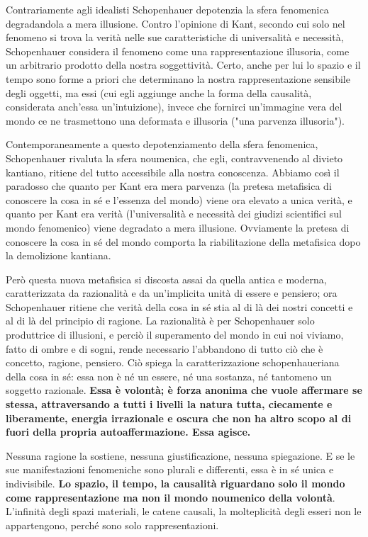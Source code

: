 Contrariamente agli idealisti Schopenhauer depotenzia la sfera fenomenica degradandola a mera illusione. Contro l’opinione di Kant, secondo cui solo nel fenomeno si trova la verità nelle sue caratteristiche di universalità e necessità, Schopenhauer considera il fenomeno come una rappresentazione illusoria, come un arbitrario prodotto della nostra soggettività. Certo, anche per lui lo spazio e il tempo sono forme a priori che determinano la nostra rappresentazione sensibile degli oggetti, ma essi (cui egli aggiunge anche la forma della causalità, considerata anch’essa un’intuizione), invece che fornirci un’immagine vera del mondo ce ne trasmettono una deformata e illusoria ("una parvenza illusoria").

Contemporaneamente a questo depotenziamento della sfera fenomenica, Schopenhauer rivaluta la sfera noumenica, che egli, contravvenendo al divieto kantiano, ritiene del tutto accessibile alla nostra conoscenza. Abbiamo così il paradosso che quanto per Kant era mera parvenza (la pretesa metafisica di conoscere la cosa in sé e l’essenza del mondo) viene ora elevato a unica verità, e quanto per Kant era verità (l’universalità e necessità dei giudizi scientifici sul mondo fenomenico) viene degradato a mera illusione. Ovviamente la pretesa di conoscere la cosa in sé del mondo comporta la riabilitazione della metafisica dopo la demolizione kantiana. 

Però questa nuova metafisica si discosta assai da quella antica e moderna, caratterizzata da razionalità e da un'implicita unità di essere e pensiero; ora Schopenhauer ritiene che verità della cosa in sé stia al di là dei nostri concetti e al di là del principio di ragione. La razionalità è per Schopenhauer solo produttrice di illusioni, e perciò il superamento del mondo in cui noi viviamo, fatto di ombre e di sogni, rende necessario l’abbandono di tutto ciò che è concetto, ragione, pensiero. Ciò spiega la caratterizzazione schopenhaueriana della cosa in sé: essa non è né un essere, né una sostanza, né tantomeno un soggetto razionale. \textbf{Essa è volontà; è forza anonima che vuole affermare se stessa, attraversando a tutti i livelli la natura tutta, ciecamente e liberamente, energia irrazionale e oscura che non ha altro scopo al di fuori della propria autoaffermazione. Essa agisce.}

Nessuna ragione la sostiene, nessuna giustificazione, nessuna spiegazione. E se le sue manifestazioni fenomeniche sono plurali e differenti, essa è in sé unica e indivisibile.\textbf{ Lo spazio, il tempo, la causalità riguardano solo il mondo come rappresentazione ma non il mondo noumenico della volontà}. L’infinità degli spazi materiali, le catene causali, la molteplicità degli esseri non le appartengono, perché sono solo rappresentazioni.


